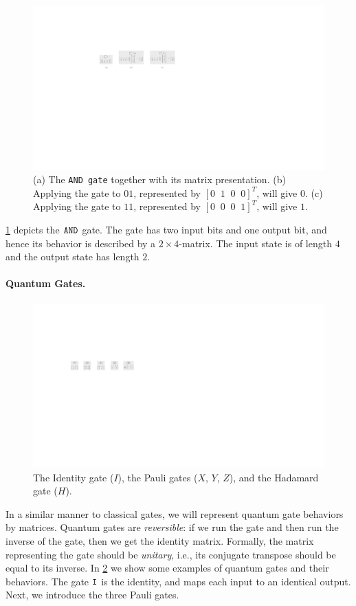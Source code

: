 \begin{figure} 
\includegraphics[scale=0.7]{Figures/Gates/and} 
\caption{(a) The {\tt AND gate} together with its matrix presentation.
(b) Applying the gate to $01$, represented by $[0\;\;1\;\;0\;\;0]^T$, will give $0$. 
(c) Applying the gate to $11$, represented by $[0\;\;0\;\;0\;\;1]^T$, will give $1$.
  }
\label{and:gate:fig}
\end{figure}
%
\cref{and:gate:fig} depicts the $\mathtt{AND}$ gate.
%
The gate has two input bits and one output bit, and hence its behavior is described by a $2\times4$-matrix.
%
The input state is of length $4$ and the output state has length $2$.

\paragraph{Quantum Gates.}
\begin{figure} 
\includegraphics[scale=0.7]{Figures/Gates/qgates} 
\caption{The Identity gate ($I$), the Pauli gates ($X$, $Y$, $Z$), and the Hadamard gate ($H$).
  }
\label{qgates:fig} 
\end{figure}
In a similar manner to classical gates, we will represent quantum gate behaviors by matrices.
%
Quantum gates are {\it reversible}: if we run the gate and then run the inverse of the gate, then we get the identity matrix.
%
Formally, the matrix representing the gate should be {\it unitary}, i.e., its conjugate transpose should be equal to its inverse.
%
In \cref{qgates:fig} we show some examples of quantum gates and their behaviors.
%
The gate $\mathtt{I}$ is the identity, and maps each input to an identical output.
%
Next, we introduce the three Pauli gates.

